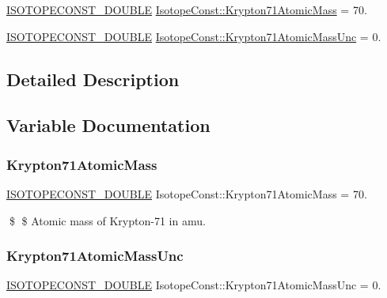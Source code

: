 \begin{DoxyCompactItemize}
\item 
\mbox{\hyperlink{group___isotope_const-_macros_ga8f45a7272ce02c0b4c65c44636ed719a}{I\+S\+O\+T\+O\+P\+E\+C\+O\+N\+S\+T\+\_\+\+D\+O\+U\+B\+LE}} \mbox{\hyperlink{group___isotope_const-_krypton-_kr71_gace78764047a8bc3b680d3a3394e65dec}{Isotope\+Const\+::\+Krypton71\+Atomic\+Mass}} = 70.
\item 
\mbox{\hyperlink{group___isotope_const-_macros_ga8f45a7272ce02c0b4c65c44636ed719a}{I\+S\+O\+T\+O\+P\+E\+C\+O\+N\+S\+T\+\_\+\+D\+O\+U\+B\+LE}} \mbox{\hyperlink{group___isotope_const-_krypton-_kr71_gac1a90b9a571134f066397b924efbf9b7}{Isotope\+Const\+::\+Krypton71\+Atomic\+Mass\+Unc}} = 0.
\end{DoxyCompactItemize}


\subsection{Detailed Description}


\subsection{Variable Documentation}
\mbox{\label{group___isotope_const-_krypton-_kr71_gace78764047a8bc3b680d3a3394e65dec}} 
\subsubsection{\texorpdfstring{Krypton71\+Atomic\+Mass}{Krypton71AtomicMass}}
{\footnotesize\ttfamily \mbox{\hyperlink{group___isotope_const-_macros_ga8f45a7272ce02c0b4c65c44636ed719a}{I\+S\+O\+T\+O\+P\+E\+C\+O\+N\+S\+T\+\_\+\+D\+O\+U\+B\+LE}} Isotope\+Const\+::\+Krypton71\+Atomic\+Mass = 70.}

\$ \$ Atomic mass of Krypton-\/71 in amu. \mbox{\label{group___isotope_const-_krypton-_kr71_gac1a90b9a571134f066397b924efbf9b7}} 
\subsubsection{\texorpdfstring{Krypton71\+Atomic\+Mass\+Unc}{Krypton71AtomicMassUnc}}
{\footnotesize\ttfamily \mbox{\hyperlink{group___isotope_const-_macros_ga8f45a7272ce02c0b4c65c44636ed719a}{I\+S\+O\+T\+O\+P\+E\+C\+O\+N\+S\+T\+\_\+\+D\+O\+U\+B\+LE}} Isotope\+Const\+::\+Krypton71\+Atomic\+Mass\+Unc = 0.}

